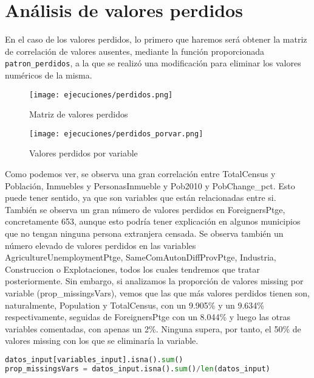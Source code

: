 \documentclass[a4paper,onecolumn]{extarticle}
\begin{document}
\begin{sloppypar}
\section{Análisis de valores perdidos}\label{perdidos}
En el caso de los valores perdidos, lo primero que haremos será obtener la matriz de correlación de valores ausentes, mediante la función proporcionada 
\texttt{patron\_perdidos}, a la que se realizó una modificación para eliminar los valores numéricos de la misma.
\begin{figure}[h!]
    \centering
    \begin{minipage}{0.50\textwidth}
        \centering
        \texttt{[image: ejecuciones/perdidos.png]}
        \caption{Matriz de valores perdidos}
        \label{fig:perdidos}
    \end{minipage}%
    \hspace{0.05\textwidth} %
    \begin{minipage}{0.40\textwidth}
        \centering
        \texttt{[image: ejecuciones/perdidos\_porvar.png]}
        \caption{Valores perdidos por variable}
        \label{fig:perdidosporvar}
    \end{minipage}
\end{figure}

Como podemos ver, se observa una gran correlación entre TotalCensus y Población, Inmuebles y PersonasInmueble y Pob2010 y PobChange\_pct. Esto puede tener sentido,
ya que son variables que están relacionadas entre si. También se observa un gran número de valores perdidos en ForeignersPtge, concretamente 653, aunque esto 
podría tener explicación en algunos municipios que no tengan ninguna persona extranjera censada. Se observa también un número elevado de valores perdidos en las 
variables AgricultureUnemploymentPtge, SameComAutonDiffProvPtge, Industria, Construccion o Explotaciones, todos los cuales tendremos que tratar posteriormente. 
Sin embargo, si analizamos la proporción de valores missing por variable (prop\_missingsVars), vemos que las que más valores perdidos tienen son, naturalmente, 
Population y TotalCensus, con un 9.905\% y un 9.634\% respectivamente, seguidas de ForeignersPtge con un 8.044\% y luego las otras variables comentadas, con 
apenas un 2\%. Ninguna supera, por tanto, el 50\% de valores missing con los que se eliminaría la variable.

\begin{lstlisting}[language=Python]
datos_input[variables_input].isna().sum()
prop_missingsVars = datos_input.isna().sum()/len(datos_input)


\end{lstlisting}
\end{sloppypar}
\end{document}
